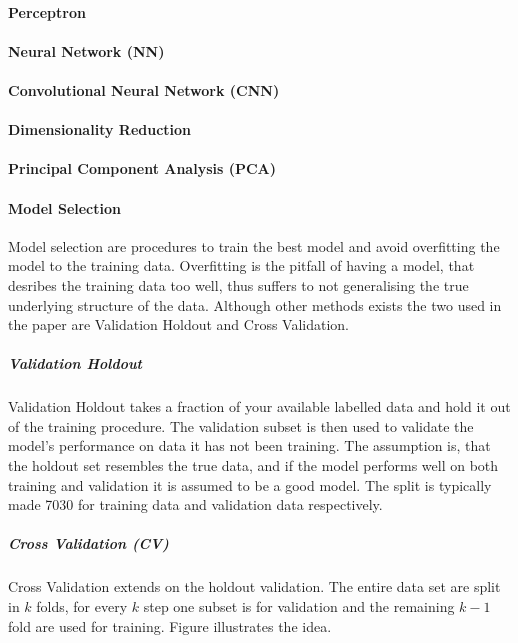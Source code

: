 \paragraph{Perceptron}

\paragraph{Neural Network (NN)}

\paragraph{Convolutional Neural Network (CNN)}

\paragraph{Dimensionality Reduction}

\paragraph{Principal Component Analysis (PCA)}

\paragraph{Model Selection}

Model selection are procedures to train the best model and avoid overfitting the model to the training data. Overfitting is the pitfall of having a model, that desribes the training data too well, thus suffers to not generalising the true underlying structure of the data. Although other methods exists the two used in the paper are Validation Holdout and Cross Validation. 

\subparagraph{Validation Holdout}

Validation Holdout takes a fraction of your available labelled data and hold it out of the training procedure. The validation subset is then used to validate the model's performance on data it has not been training. The assumption is, that the holdout set resembles the true data, and if the model performs well on both training and validation it is assumed to be a good model. The split is typically made 70\/30 for training data and validation data respectively. 

\subparagraph{Cross Validation (CV)}

Cross Validation extends on the holdout validation. The entire data set are split in $k$ folds, for every $k$ step one subset is for validation and the remaining $k-1$ fold are used for training. Figure illustrates the idea. 

